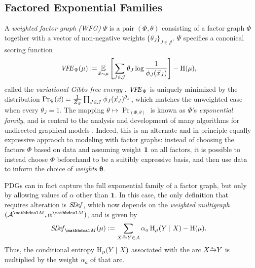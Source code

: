 \subsection{Factored Exponential Families}\label{sec:expfam}

A \emph{weighted factor graph (WFG)} $\Psi$ is a pair
$(\Phi,\theta)$ consisting of a factor graph $\Phi$ 
together with a vector of non-negative weights
$\{ \theta_J \}_{J \in \mathcal J}$.
$\Psi$ specifies a canonical scoring function 
\begin{equation}
\mathit{V\mkern-4mu F\mkern-4.5mu E}_{\Psi}(\mu)
	 := \!\operatorname*{\mathbb{E}}_{\vec x\sim\mu}\left[  \sum_{J \in
           \cal J} \theta_J \log\frac1{\phi_J(\vec
               x_J)}\right] - \operatorname{\mathrm{H}}(\mu)  , 
			   \label{eqn:free-energy}
\end{equation}
called the \emph{variational
Gibbs free energy} \citep{mezard2009information}. 
$\mathit{V\mkern-4mu F\mkern-4.5mu E}_{\Psi}$ is uniquely minimized by the distribution
${\Pr}_{\Psi}(\vec x) = \frac{1}{Z_{\Psi}}
 	\prod_{J \in \cal J} \phi_J(\vec x_J)^{\theta_J}$, 
which matches the unweighted case when every $\theta_J = 1$.
The mapping $\theta \mapsto \Pr_{(\Phi,\theta)}$ is known as 
$\Phi$'s \emph{exponential family}, and is central to the analysis
and development of many algorithms for undirected 
graphical models \citep{wainwright2008graphical}.
Indeed, this is an alternate and in principle equally expressive 
appraoch to modeling with factor graphs: instead of choosing the factors $\Phi$
based on data and assuming weight $\mathbf 1$ on all factors,
it is possible to instead choose $\Phi$ beforehand to be a suitibly expressive basis, 
and then use data to inform the choice of \emph{weights} $\boldsymbol\theta$. 

PDGs can in fact capture the full exponential family of a factor graph, but only
by allowing values of $\alpha$ other than ${\bf 1}$. In this case, the
only definition  
that requires alteration is $\mathit{S\mskip-3.5muD\mskip-2.5mue\mskip-1.5muf}$, which now depends on the \emph{weighted multigraph}
$(\Ar^{\dg M}, \alpha^{\dg M})$, and is given by
\begin{equation}
	\SDef_{\dg M}(\mu) := \sum_{\ed aXY \in \Ar} \alpha_a \H_\mu(Y\mid X) - \H(\mu). 
	\label{eqn:alt-extra2}
\end{equation}
Thus, the conditional entropy $\operatorname{\mathrm{H}}_\mu(Y\mid X)$ associated with the
arc $\ed aXY$ is multiplied by the weight $\alpha_a$ of that arc.

